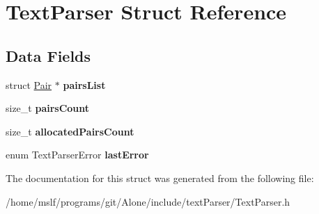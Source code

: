 \hypertarget{struct_text_parser}{}\section{Text\+Parser Struct Reference}
\label{struct_text_parser}
\subsection*{Data Fields}
\begin{DoxyCompactItemize}
\item 
\hypertarget{struct_text_parser_a311aae354eec049861eb556c1b0e1776}{}\label{struct_text_parser_a311aae354eec049861eb556c1b0e1776} 
struct \hyperlink{struct_pair}{Pair} $\ast$ {\bfseries pairs\+List}
\item 
\hypertarget{struct_text_parser_a7a80ad9b6aca5708b96406da00437010}{}\label{struct_text_parser_a7a80ad9b6aca5708b96406da00437010} 
size\+\_\+t {\bfseries pairs\+Count}
\item 
\hypertarget{struct_text_parser_a0c09e3bb8d61dd466fa85b59029408b1}{}\label{struct_text_parser_a0c09e3bb8d61dd466fa85b59029408b1} 
size\+\_\+t {\bfseries allocated\+Pairs\+Count}
\item 
\hypertarget{struct_text_parser_aecb02976c4ac737d7ebe3a5e0b03977b}{}\label{struct_text_parser_aecb02976c4ac737d7ebe3a5e0b03977b} 
enum Text\+Parser\+Error {\bfseries last\+Error}
\end{DoxyCompactItemize}


The documentation for this struct was generated from the following file\+:\begin{DoxyCompactItemize}
\item 
/home/mslf/programs/git/\+Alone/include/text\+Parser/Text\+Parser.\+h\end{DoxyCompactItemize}
